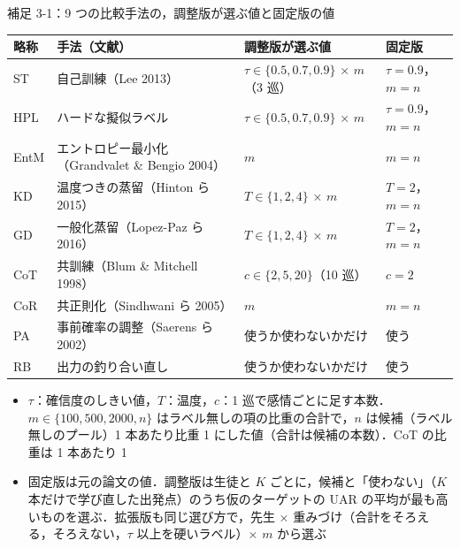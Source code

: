 \begin{frame}{補足 3-1：9 つの比較手法の，調整版が選ぶ値と固定版の値}
  \label{s:c:grid}
  \vspace{-0.4em}
  \centering\scriptsize
  \renewcommand{\arraystretch}{1.12}
  \begin{tabularx}{\textwidth}{@{}l l >{\raggedright\arraybackslash}X l@{}}
    \toprule
    略称 & 手法（文献） & 調整版が選ぶ値 & 固定版 \\
    \midrule
    ST & 自己訓練（Lee 2013） & $\tau \in \{0.5, 0.7, 0.9\}$ × $m$（3 巡） & $\tau = 0.9$，$m = n$ \\
    HPL & ハードな擬似ラベル & $\tau \in \{0.5, 0.7, 0.9\}$ × $m$ & $\tau = 0.9$，$m = n$ \\
    EntM & エントロピー最小化（Grandvalet \& Bengio 2004） & $m$ & $m = n$ \\
    KD & 温度つきの蒸留（Hinton ら 2015） & $T \in \{1, 2, 4\}$ × $m$ & $T = 2$，$m = n$ \\
    GD & 一般化蒸留（Lopez-Paz ら 2016） & $T \in \{1, 2, 4\}$ × $m$ & $T = 2$，$m = n$ \\
    CoT & 共訓練（Blum \& Mitchell 1998） & $c \in \{2, 5, 20\}$（10 巡） & $c = 2$ \\
    CoR & 共正則化（Sindhwani ら 2005） & $m$ & $m = n$ \\
    PA & 事前確率の調整（Saerens ら 2002） & 使うか使わないかだけ & 使う \\
    RB & 出力の釣り合い直し & 使うか使わないかだけ & 使う \\
    \bottomrule
  \end{tabularx}\par
  \vspace{0.4em}\raggedright
  \begin{itemize}\scriptsize\setlength{\itemsep}{2pt}
    \item $\tau$：確信度のしきい値，$T$：温度，$c$：1 巡で感情ごとに足す本数．$m \in \{100, 500, 2000, n\}$ はラベル無しの項の比重の合計で，$n$ は候補（ラベル無しのプール）1 本あたり比重 1 にした値（合計は候補の本数）．CoT の比重は 1 本あたり 1
    \item 固定版は元の論文の値．調整版は生徒と $K$ ごとに，候補と「使わない」（$K$ 本だけで学び直した出発点）のうち仮のターゲットの UAR の平均が最も高いものを選ぶ．拡張版も同じ選び方で，先生 × 重みづけ（合計をそろえる，そろえない，$\tau$ 以上を硬いラベル）× $m$ から選ぶ
  \end{itemize}
\end{frame}

